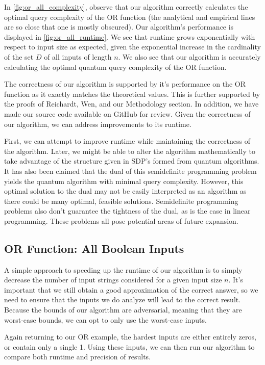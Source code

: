 In \cref{fig:or_all_complexity}, observe that our algorithm
correctly calculates the optimal query complexity of the OR function (the
analytical and empirical lines are so close that one
is mostly obscured).
Our algorithm's performance is displayed in \cref{fig:or_all_runtime}.
We see that runtime grows exponentially with respect to input size as expected, 
given the exponential increase in the cardinality of the set $D$ of all
inputs of length $n$. 
We also see that our algorithm is accurately calculating the
optimal quantum query complexity of the OR function. 

The correctness of our algorithm is supported 
by it's performance on the OR function as it 
exactly matches the theoretical values. 
This is further supported by the proofs of Reichardt, 
Wen, and our Methodology section. 
In addition, we have made our source code 
available on GitHub for review. 
Given the correctness of our algorithm, 
we can address improvements to its runtime.

First, we can attempt to improve runtime while
maintaining the correctness of the algorithm. Later,
we might be able to alter the algorithm
mathematically to take advantage of the structure
given in SDP's formed from quantum algorithms. 
It has also been claimed that the dual of this semidefinite
programming problem yields the quantum algorithm with minimal query complexity.
However, this optimal solution to the dual may not be easily 
interpreted as an algorithm as there could be many optimal, feasible solutions. 
Semidefinite programming problems also don't guarantee the tightness of the dual,
as is the case in linear programming. 
These problems all pose potential areas of future expansion.

\subsection{OR Function: All Boolean Inputs}

A simple approach to speeding up the runtime of our
algorithm is to simply decrease the number of input
strings considered for a given input size $n$. It's
important that we still obtain a good approximation
of the correct answer, so we need to ensure that the
inputs we do analyze will lead to the correct result.
Because the bounds of our algorithm are adversarial,
meaning that they are worst-case bounds, we can opt
to only use the worst-case inputs.

Again returning to our OR example, the hardest inputs are
either entirely zeros, or contain only a single 1. 
Using these inputs, we can then run our algorithm to 
compare both runtime and precision of results.

